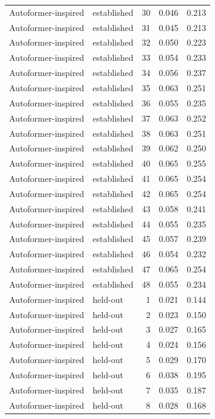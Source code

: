 \begin{tabular}{llrrr}
Autoformer-inspired & established & 30 & 0.046 & 0.213 \\
Autoformer-inspired & established & 31 & 0.045 & 0.213 \\
Autoformer-inspired & established & 32 & 0.050 & 0.223 \\
Autoformer-inspired & established & 33 & 0.054 & 0.233 \\
Autoformer-inspired & established & 34 & 0.056 & 0.237 \\
Autoformer-inspired & established & 35 & 0.063 & 0.251 \\
Autoformer-inspired & established & 36 & 0.055 & 0.235 \\
Autoformer-inspired & established & 37 & 0.063 & 0.252 \\
Autoformer-inspired & established & 38 & 0.063 & 0.251 \\
Autoformer-inspired & established & 39 & 0.062 & 0.250 \\
Autoformer-inspired & established & 40 & 0.065 & 0.255 \\
Autoformer-inspired & established & 41 & 0.065 & 0.254 \\
Autoformer-inspired & established & 42 & 0.065 & 0.254 \\
Autoformer-inspired & established & 43 & 0.058 & 0.241 \\
Autoformer-inspired & established & 44 & 0.055 & 0.235 \\
Autoformer-inspired & established & 45 & 0.057 & 0.239 \\
Autoformer-inspired & established & 46 & 0.054 & 0.232 \\
Autoformer-inspired & established & 47 & 0.065 & 0.254 \\
Autoformer-inspired & established & 48 & 0.055 & 0.234 \\
Autoformer-inspired & held-out & 1 & 0.021 & 0.144 \\
Autoformer-inspired & held-out & 2 & 0.023 & 0.150 \\
Autoformer-inspired & held-out & 3 & 0.027 & 0.165 \\
Autoformer-inspired & held-out & 4 & 0.024 & 0.156 \\
Autoformer-inspired & held-out & 5 & 0.029 & 0.170 \\
Autoformer-inspired & held-out & 6 & 0.038 & 0.195 \\
Autoformer-inspired & held-out & 7 & 0.035 & 0.187 \\
Autoformer-inspired & held-out & 8 & 0.028 & 0.168 \\

\end{tabular}

